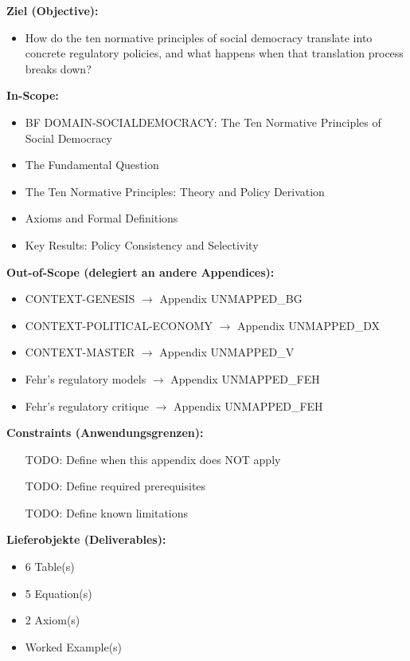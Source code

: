 \begin{tcolorbox}[
    colback=orange!5!white,
    colframe=orange!75!black,
    title={\textbf{Appendix Scope: Ziel / In-Scope / Out-of-Scope / Constraints}},
    fonttitle=\bfseries
]

\textbf{Ziel (Objective):}
\begin{itemize}[nosep]
    \item How do the ten normative principles of social democracy translate into concrete regulatory policies, and what happens when that translation process breaks down?
\end{itemize}

\textbf{In-Scope:}
\begin{itemize}[nosep]
    \item BF DOMAIN-SOCIALDEMOCRACY: The Ten Normative Principles of Social Democracy
    \item The Fundamental Question
    \item The Ten Normative Principles: Theory and Policy Derivation
    \item Axioms and Formal Definitions
    \item Key Results: Policy Consistency and Selectivity
\end{itemize}

\textbf{Out-of-Scope (delegiert an andere Appendices):}
\begin{itemize}[nosep]
    \item CONTEXT-GENESIS $\rightarrow$ Appendix UNMAPPED_BG
    \item CONTEXT-POLITICAL-ECONOMY $\rightarrow$ Appendix UNMAPPED_DX
    \item CONTEXT-MASTER $\rightarrow$ Appendix UNMAPPED_V
    \item Fehr's regulatory models $\rightarrow$ Appendix UNMAPPED_FEH
    \item Fehr's regulatory critique $\rightarrow$ Appendix UNMAPPED_FEH
\end{itemize}

\textbf{Constraints (Anwendungsgrenzen):}
\begin{itemize}[nosep]
    \item [TODO: Define when this appendix does NOT apply]
    \item [TODO: Define required prerequisites]
    \item [TODO: Define known limitations]
\end{itemize}

\textbf{Lieferobjekte (Deliverables):}
\begin{itemize}[nosep]
    \item 6 Table(s)
    \item 5 Equation(s)
    \item 2 Axiom(s)
    \item Worked Example(s)
\end{itemize}

\end{tcolorbox}


